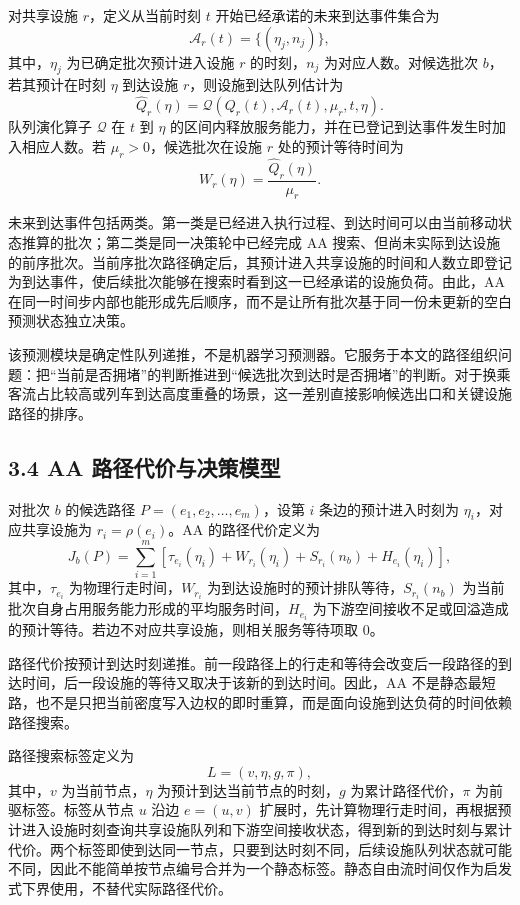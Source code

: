 \documentclass[UTF8,a4paper,12pt]{ctexart}
\begin{document}
对共享设施 \(r\)，定义从当前时刻 \(t\) 开始已经承诺的未来到达事件集合为
\[
\mathcal{A}_r(t)=\{(\eta_j,n_j)\},
\]
其中，\(\eta_j\) 为已确定批次预计进入设施 \(r\) 的时刻，\(n_j\) 为对应人数。对候选批次 \(b\)，若其预计在时刻 \(\eta\) 到达设施 \(r\)，则设施到达队列估计为
\[
\widehat Q_r(\eta)=\mathcal{Q}\left(Q_r(t),\mathcal{A}_r(t),\mu_r,t,\eta\right).
\]
队列演化算子 \(\mathcal{Q}\) 在 \(t\) 到 \(\eta\) 的区间内释放服务能力，并在已登记到达事件发生时加入相应人数。若 \(\mu_r>0\)，候选批次在设施 \(r\) 处的预计等待时间为
\[
W_r(\eta)=\frac{\widehat Q_r(\eta)}{\mu_r}.
\]

未来到达事件包括两类。第一类是已经进入执行过程、到达时间可以由当前移动状态推算的批次；第二类是同一决策轮中已经完成 AA 搜索、但尚未实际到达设施的前序批次。当前序批次路径确定后，其预计进入共享设施的时间和人数立即登记为到达事件，使后续批次能够在搜索时看到这一已经承诺的设施负荷。由此，AA 在同一时间步内部也能形成先后顺序，而不是让所有批次基于同一份未更新的空白预测状态独立决策。

该预测模块是确定性队列递推，不是机器学习预测器。它服务于本文的路径组织问题：把“当前是否拥堵”的判断推进到“候选批次到达时是否拥堵”的判断。对于换乘客流占比较高或列车到达高度重叠的场景，这一差别直接影响候选出口和关键设施路径的排序。

\subsection{3.4 AA 路径代价与决策模型}

对批次 \(b\) 的候选路径 \(P=(e_1,e_2,\ldots,e_m)\)，设第 \(i\) 条边的预计进入时刻为 \(\eta_i\)，对应共享设施为 \(r_i=\rho(e_i)\)。AA 的路径代价定义为
\[
J_b(P)=\sum_{i=1}^{m}\left[\tau_{e_i}(\eta_i)+W_{r_i}(\eta_i)+S_{r_i}(n_b)+H_{e_i}(\eta_i)\right],
\]
其中，\(\tau_{e_i}\) 为物理行走时间，\(W_{r_i}\) 为到达设施时的预计排队等待，\(S_{r_i}(n_b)\) 为当前批次自身占用服务能力形成的平均服务时间，\(H_{e_i}\) 为下游空间接收不足或回溢造成的预计等待。若边不对应共享设施，则相关服务等待项取 0。

路径代价按预计到达时刻递推。前一段路径上的行走和等待会改变后一段路径的到达时间，后一段设施的等待又取决于该新的到达时间。因此，AA 不是静态最短路，也不是只把当前密度写入边权的即时重算，而是面向设施到达负荷的时间依赖路径搜索。

路径搜索标签定义为
\[
L=(v,\eta,g,\pi),
\]
其中，\(v\) 为当前节点，\(\eta\) 为预计到达当前节点的时刻，\(g\) 为累计路径代价，\(\pi\) 为前驱标签。标签从节点 \(u\) 沿边 \(e=(u,v)\) 扩展时，先计算物理行走时间，再根据预计进入设施时刻查询共享设施队列和下游空间接收状态，得到新的到达时刻与累计代价。两个标签即使到达同一节点，只要到达时刻不同，后续设施队列状态就可能不同，因此不能简单按节点编号合并为一个静态标签。静态自由流时间仅作为启发式下界使用，不替代实际路径代价。
\end{document}
